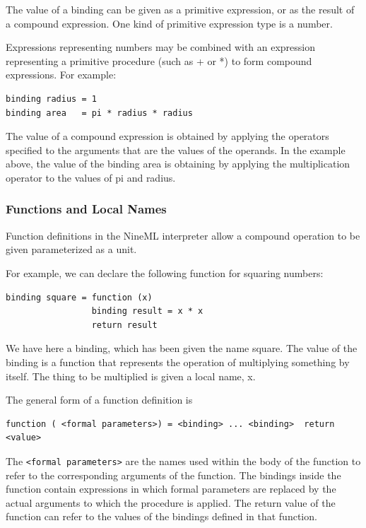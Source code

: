 \documentclass[a4paper]{article}
\begin{document}
The value of a binding can be given as a primitive expression, or as
the result of a compound expression. One kind of primitive expression
type is a number.

Expressions representing numbers may be combined with an expression
representing a primitive procedure (such as + or *) to form compound
expressions. For example:

\begin{lstlisting}[style=display]
binding radius = 1
binding area   = pi * radius * radius
\end{lstlisting}

The value of a compound expression is obtained by applying the
operators specified to the arguments that are the values of the
operands. In the example above, the value of the binding area is
obtaining by applying the multiplication operator to the values of pi
and radius.

\subsubsection{Functions and Local Names}

Function definitions in the NineML interpreter allow a compound operation to be given
parameterized as a unit.

For example, we can declare the following function for squaring
numbers:

\begin{lstlisting}[style=display]
binding square = function (x)
                 binding result = x * x
                 return result
\end{lstlisting}

We have here a binding, which has been given the name square. The
value of the binding is a function that represents the operation of
multiplying something by itself. The thing to be multiplied is given a
local name, x.

The general form of a function definition is

\begin{lstlisting}[style=display]
function ( <formal parameters>) = <binding> ... <binding>  return <value>
\end{lstlisting}
 
The \verb^<formal parameters>^ are the names used within the body of the
function to refer to the corresponding arguments of the function. The
bindings inside the function contain expressions in which formal
parameters are replaced by the actual arguments to which the procedure
is applied. The return value of the function can refer to the values
of the bindings defined in that function.
\end{document}
